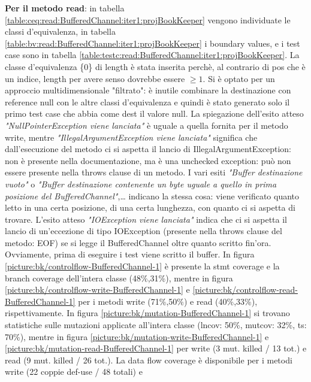 \documentclass[10pt, a4paper]{article}
\newcommand{\gettablelabel}[5]{table:#1:#2:#3:iter#4:proj#5}
\newcommand{\getpicturelabel}[1]{picture:#1}
\def\bookkeeper{BookKeeper}
\newcommand{\ceq}[1]{\{#1\}}
\begin{document}
	\textbf{Per il metodo read}: in tabella \ref{\gettablelabel{ceq}{read}{BufferedChannel}{1}{\bookkeeper}}
	vengono individuate le classi d'equivalenza, in tabella 
	\ref{\gettablelabel{bv}{read}{BufferedChannel}{1}{\bookkeeper}} 
	i boundary values, e i test case sono in tabella 
	\ref{\gettablelabel{testc}{read}{BufferedChannel}{1}{\bookkeeper}}.
	La classe d'equivalenza \ceq{0} di length è stata inserita perchè, al contrario di pos che è un indice, 
	length per avere senso dovrebbe essere $\ge 1$.
	Si è optato per un approccio multidimensionale "filtrato": è inutile combinare la destinazione con reference
	null con le altre classi d'equivalenza e quindi è stato generato solo il primo test case che abbia come
	dest il valore null.
	La spiegazione dell'esito atteso \textit{"NullPointerException viene lanciata"} è uguale a quella fornita
	per il metodo write, mentre \textit{"IllegalArgumentException viene lanciata"} significa che dall'esecuzione
	del metodo ci si aspetta il lancio di IllegalArgumentException: non è presente nella documentazione, ma è
	una unchecked exception: può non essere presente nella throws clause di un metodo.
	I vari esiti \textit{"Buffer destinazione vuoto"} o 
	\textit{"Buffer destinazione contenente un byte uguale a quello in prima posizione del BufferedChannel"},\dots
	indicano la stessa cosa: 
	viene verificato quanto letto in una certa posizione, di una certa lunghezza, 
	con quanto ci si aspetta di trovare. 
	L'esito atteso \textit{"IOException viene lanciata"} indica che ci si aspetta il lancio di un'eccezione di tipo 
	IOException (presente nella throws clause del metodo: EOF) 
	se si legge il BufferedChannel oltre quanto scritto fin'ora. 
	Ovviamente, prima di eseguire i test viene scritto il buffer.
	In figura \ref{\getpicturelabel{bk/controlflow-BufferedChannel-1}} è presente la stmt coverage e la branch
	coverage dell'intera classe (48\%,31\%), 
	mentre in figura \ref{\getpicturelabel{bk/controlflow-write-BufferedChannel-1}} e 
	\ref{\getpicturelabel{bk/controlflow-read-BufferedChannel-1}} per i metodi 
	write (71\%,50\%) e read (40\%,33\%), rispettivamente.
	In figura \ref{\getpicturelabel{bk/mutation-BufferedChannel-1}} si trovano statistiche sulle mutazioni
	applicate all'intera classe (lncov: 50\%, mutcov: 32\%, ts: 70\%), mentre in figura \ref{\getpicturelabel{bk/mutation-write-BufferedChannel-1}} e 
	\ref{\getpicturelabel{bk/mutation-read-BufferedChannel-1}} per write (3 mut. killed / 13 tot.) e read (9 mut. killed / 26 tot.).
	La data flow coverage è disponibile per i metodi write (22 coppie def-use / 48 totali) e 
\end{document}
